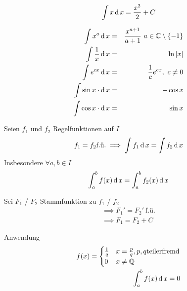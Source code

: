 \begin{Bsp}
  \[\int x\operatorname{d} x = \frac{x^2}{2} + C\]
\end{Bsp}
\begin{Eig}
  \begin{align*}
    \int x^a\operatorname{d} x &=&  \frac{x^{a+1}}{a+1}\ a\in \mathbb{C}\setminus \{-1\}\\
    \int \frac{1}{x}\operatorname{d} x &=&  \ln\left| x \right|\\
    \int e^{cx} \operatorname{d} x &=&  \frac{1}{c}e^{cx},\ c\neq 0\\
    \int \sin x \cdot \operatorname{d} x &=& -\cos x\\
    \int \cos x \cdot \operatorname{d} x &=& \sin x
  \end{align*}
\end{Eig}
\begin{Sat}
  Seien $f_1$ und $f_2$ Regelfunktionen auf $I$
  \begin{align*}
    f_1=f_2 \text{f.ü.} \implies \int f_1 \operatorname{d} x=\int f_2 \operatorname{d} x
  \end{align*}
  Insbesondere $\forall a,b \in I$
  \begin{align*}
    \int^b_af(x)\operatorname{d} x = \int^b_a f_2(x)\operatorname{d} x
  \end{align*}
\end{Sat}
\begin{Bew}
  Sei $F_1$ / $F_2$ Stammfunktion zu $f_1$ / $f_2$
  \begin{align*}
    \implies F_1'=F_2'\ \text{f.ü.}\\
    \implies F_1=F_2+C
  \end{align*}
\end{Bew}
\begin{Bem}{Anwendung}
  \begin{align*}
    f(x)=\begin{cases}
      \frac{1}{q} & x=\frac{p}{q}, p,q \text{teilerfremd}\\
      0 & x\neq \mathbb{Q}
    \end{cases}\\
    \int^b_a f(x)\operatorname{d} x =0
  \end{align*}
\end{Bem}

